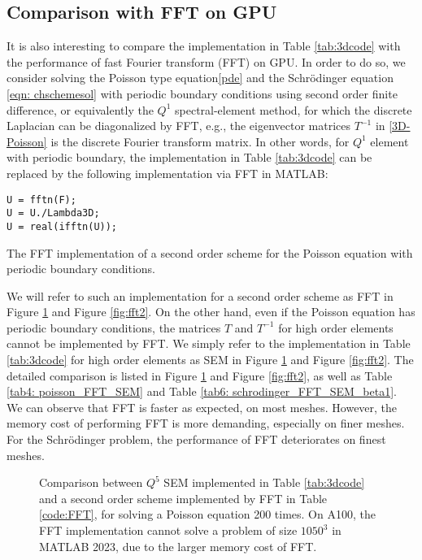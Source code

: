 \documentclass{article}
\begin{document}
\subsection{Comparison with FFT on GPU}

It is also interesting to compare the implementation in Table \ref{tab:3dcode} with the performance of  fast Fourier transform (FFT) on GPU. 
In order to do so, we consider solving the  Poisson type  equation\eqref{pde} and the Schr{\"o}dinger equation \eqref{eqn: chschemesol}  with periodic boundary conditions using second order finite difference, or equivalently the $Q^1$ spectral-element method, for which the discrete Laplacian can be diagonalized by FFT, e.g., the eigenvector matrices $T^{-1}$ in \eqref{3D-Poisson} is the discrete Fourier transform matrix.
In other words, for $Q^1$ element with periodic boundary, the implementation in Table \ref{tab:3dcode}
can be replaced by the following implementation via FFT in MATLAB:
\begin{table}[htbp]
   \begin{lstlisting}
U = fftn(F);
U = U./Lambda3D;
U = real(ifftn(U));
    \end{lstlisting}
\caption{The FFT implementation of  a second order scheme for the Poisson equation  with periodic boundary conditions.}
\label{code:FFT}
\end{table}

 We will refer to such an implementation for a second order scheme as FFT in Figure \ref{fig:fft1} and  Figure \ref{fig:fft2}.
On the other hand, even if  the  Poisson equation has periodic boundary conditions, the matrices $T$ and $T^{-1}$ for high order elements cannot be implemented by FFT. We simply refer to the implementation in Table \ref{tab:3dcode} for  high order elements as SEM in  Figure \ref{fig:fft1} and  Figure \ref{fig:fft2}. 
The detailed comparison is listed in Figure \ref{fig:fft1} and  Figure \ref{fig:fft2}, as well as 
Table \ref{tab4: poisson_FFT_SEM} and Table \ref{tab6: schrodinger_FFT_SEM_beta1}. We can observe that FFT is faster as expected, on most meshes. However, the memory cost of performing FFT is more demanding, especially on finer meshes. For the Schr{\"o}dinger problem, the performance of FFT deteriorates on finest meshes. 
 

\begin{figure}[ht!]
\caption{Comparison between $Q^5$ SEM implemented in Table \ref{tab:3dcode} and a second order scheme implemented by FFT in Table \ref{code:FFT}, for solving a Poisson equation 200 times. On A100, the FFT implementation cannot solve a problem of size $1050^3$ in MATLAB 2023, due to the larger memory cost of FFT. }
	\label{fig:fft1}
 \end{figure}
\end{document}
